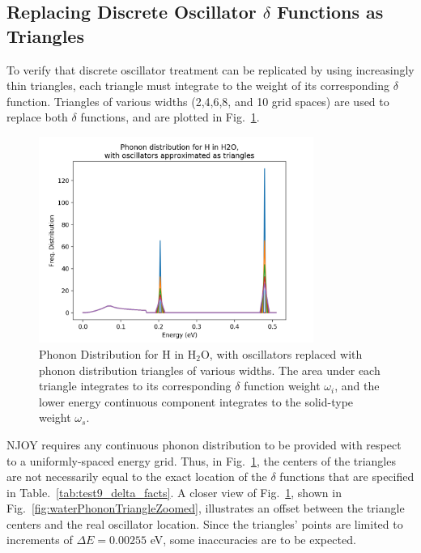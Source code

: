 \documentclass[Master.tex]{subfiles}
\begin{document}
		\subsection{Replacing Discrete Oscillator $\delta$ Functions as Triangles}
                  To verify that discrete oscillator treatment can be replicated by using increasingly thin triangles, each triangle must integrate to the weight of its corresponding $\delta$ function. Triangles of various widths (2,4,6,8, and 10 grid spaces) are used to replace both $\delta$ functions, and are plotted in Fig.~\ref{fig:waterPhononTriangle}.
            \begin{figure}[h]
              \begin{center}
              \includegraphics[width=0.8\textwidth]{waterPhononDistTriangles}
                \caption[Phonon Distribution for H in H$_2$O, with oscillators replaced with phonon distribution triangles of various widths]{Phonon Distribution for H in H$_2$O, with oscillators replaced with phonon distribution triangles of various widths. The area under each triangle integrates to its corresponding $\delta$ function weight $\omega_i$, and the lower energy continuous component integrates to the solid-type weight $\omega_s$.}
              \label{fig:waterPhononTriangle}
              \end{center}
            \end{figure}

            NJOY requires any continuous phonon distribution to be provided with respect to a uniformly-spaced energy grid. Thus, in Fig.~\ref{fig:waterPhononTriangle}, the centers of the triangles are not necessarily equal to the exact location of the $\delta$ functions that are specified in Table.~\ref{tab:test9_delta_facts}. A closer view of Fig.~\ref{fig:waterPhononTriangle}, shown in Fig.~\ref{fig:waterPhononTriangleZoomed}, illustrates an offset between the triangle centers and the real oscillator location. Since the triangles' points are limited to increments of $\Delta E=0.00255$ eV, some inaccuracies are to be expected.
\end{document}

